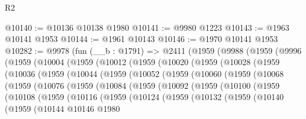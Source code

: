 \begin{lexlean}{R2}
\begin{coremodule}
@10140 := @10136 @10138 @1980
@10141 := @9980 @1223
@10143 := @1963 @10141 @1953
@10144 := @1961 @10143
@10146 := @1970 @10141 @1953
@10282 := @9978
    (fun (__b : @1791) =>
    @2411
      (@1959
        (@9988
          (@1959
            (@9996
              (@1959
                (@10004
                  (@1959
                    (@10012
                      (@1959
                        (@10020
                          (@1959
                            (@10028
                              (@1959
                                (@10036
                                  (@1959
                                    (@10044
                                      (@1959
                                        (@10052
                                          (@1959
                                            (@10060
                                              (@1959
                                                (@10068
                                                  (@1959
                                                    (@10076
                                                      (@1959
                                                        (@10084
                                                          (@1959
                                                            (@10092
                                                              (@1959
                                                                (@10100
                                                                  (@1959
                                                                    (@10108
                                                                      (@1959
                                                                        (@10116
                                                                          (@1959
                                                                            (@10124
                                                                              (@1959
                                                                                (@10132
                                                                                  (@1959
                                                                                    (@10140
                                                                                      (@1959
                                                                                        (@10144
                                                                                          @10146
                                                                                          @1980

\end{coremodule}
\end{lexlean}
